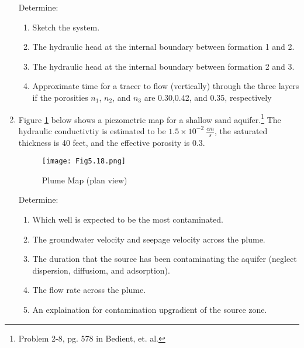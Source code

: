 \documentclass[12pt]{article}
\begin{document}
\begin{enumerate}
Determine:
\begin{enumerate}
\item Sketch the system.
\item The hydraulic head at the internal boundary between formation 1 and 2.
\item The hydraulic head at the internal boundary between formation 2 and 3.
\item Approximate time for a tracer to flow (vertically) through the three layers if the porosities $n_1$, $n_2$, and $n_3$ are 0.30,0.42, and 0.35, respectively
\end{enumerate}

\clearpage

\item Figure \ref{fig:plumemap} below shows a piezometric map for a shallow sand aquifer.\footnote{Problem 2-8, pg. 578 in Bedient, et. al.}  The hydraulic conductivtiy is estimated to be $1.5 \times 10^{-2}~\frac{cm}{s}$, the saturated thickness is 40 feet, and the effective porosity is 0.3.

\begin{figure}[h!] %
   \centering
   \texttt{[image: Fig5.18.png]} 
   \caption{Plume Map (plan view)}
   \label{fig:plumemap}
\end{figure}

Determine:
\begin{enumerate}
\item Which well is expected to be the most contaminated.
\item The groundwater velocity and seepage velocity across the plume.
\item The duration that the source has been contaminating the aquifer (neglect dispersion, diffusiom, and adsorption).
\item The flow rate across the plume.
\item An explaination for contamination upgradient of the source zone.
\end{enumerate}

\end{enumerate}
\end{document}
